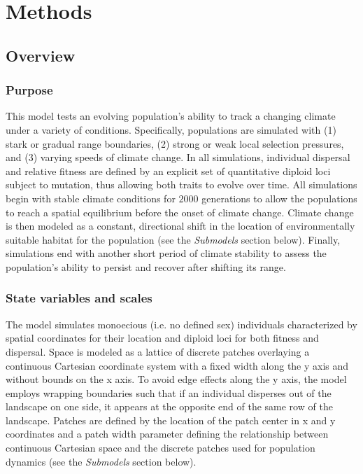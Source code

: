 \documentclass[11pt, oneside]{article}
\begin{document}
\section{Methods}
\subsection{Overview}
\subsubsection{Purpose}
This model tests an evolving population's ability to track a changing climate under a variety of conditions. Specifically, populations are simulated with (1) stark or gradual range boundaries, (2) strong or weak local selection pressures, and (3) varying speeds of climate change. In all simulations, individual dispersal and relative fitness are defined by an explicit set of quantitative diploid loci subject to mutation, thus allowing both traits to evolve over time. All simulations begin with stable climate conditions for $2000$ generations to allow the populations to reach a spatial equilibrium before the onset of climate change. Climate change is then modeled as a constant, directional shift in the location of environmentally suitable habitat for the population (see the \textit{Submodels} section below). Finally, simulations end with another short period of climate stability to assess the population's ability to persist and recover after shifting its range.

\subsubsection{State variables and scales}
The model simulates monoecious (i.e. no defined sex) individuals characterized by spatial coordinates for their location and diploid loci for both fitness and dispersal. Space is modeled as a lattice of discrete patches overlaying a continuous Cartesian coordinate system with a fixed width along the y axis and without bounds on the x axis. To avoid edge effects along the y axis, the model employs wrapping boundaries such that if an individual disperses out of the landscape on one side, it appears at the opposite end of the same row of the landscape. Patches are defined by the location of the patch center in x and y coordinates and a patch width parameter defining the relationship between continuous Cartesian space and the discrete patches used for population dynamics (see the \textit{Submodels} section below). 
\end{document}
